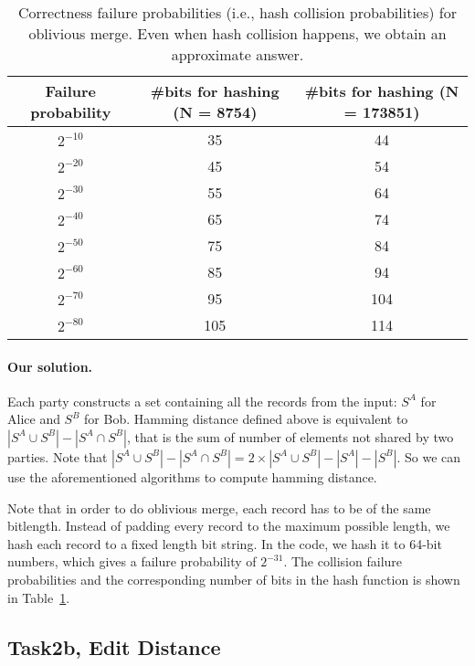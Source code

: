 \begin{table}[t]
  \centering
  \begin{tabular}{c|c|c}
    Failure probability&  \#bits for hashing (N = 8754)   & \#bits for hashing (N = 173851) \\ \hline
    $2^{-10}$ & 35 & 44 \\
    $2^{-20}$ &45 & 54 \\
    $2^{-30}$ & 55 & 64 \\
    $2^{-40}$ & 65& 74 \\
    $2^{-50}$ & 75& 84 \\
    $2^{-60}$ & 85 & 94 \\
    $2^{-70}$ & 95 & 104 \\
    $2^{-80}$ & 105 & 114 \\
  \end{tabular}
  \caption{Correctness failure probabilities (i.e., hash collision probabilities) 
for oblivious merge. Even when hash collision happens, we obtain an 
approximate answer.}
  \label{fig:failure-hashing}
\end{table}



\paragraph{Our solution.}
Each party constructs a set containing all the records from the input: $S^A$ for Alice and $S^B$ for Bob.
Hamming distance defined above is equivalent to $|S^A\cup S^B| - |S^A\cap S^B|$, that is the sum of number of elements not shared by two parties.
Note that $|S^A\cup S^B| - |S^A\cap S^B| = 2\times|S^A\cup S^B|-|S^A| - |S^B|$. So we can use the aforementioned algorithms to compute hamming distance.

Note that in order to do oblivious merge, each record has to be of the same bitlength. Instead of padding every record to the maximum possible length, we hash each
record to a fixed length bit string. In the code, we hash it to 64-bit numbers, which gives a failure probability of $2^{-31}$. The collision failure probabilities and the corresponding number of bits in the hash function is shown in Table~\ref{fig:failure-hashing}.

\subsection{Task2b, Edit Distance}
